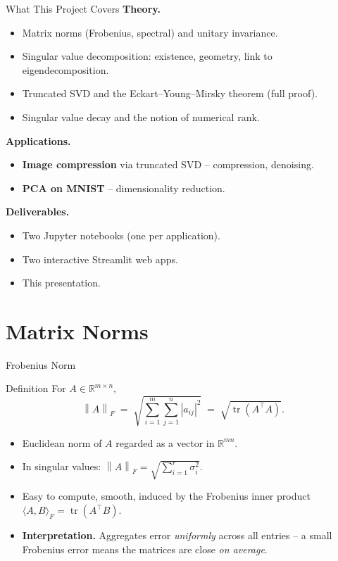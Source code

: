 \documentclass[10pt,aspectratio=169]{beamer}
\DeclareMathOperator{\tr}{tr}
\newcommand{\R}{\mathbb{R}}
\newcommand{\norm}[1]{\left\|#1\right\|}
\begin{document}
\begin{frame}{What This Project Covers}
  \textbf{Theory.}
  \begin{itemize}
    \item Matrix norms (Frobenius, spectral) and unitary invariance.
    \item Singular value decomposition: existence, geometry, link to eigendecomposition.
    \item Truncated SVD and the Eckart--Young--Mirsky theorem (full proof).
    \item Singular value decay and the notion of numerical rank.
  \end{itemize}
  \textbf{Applications.}
  \begin{itemize}
    \item \textbf{Image compression} via truncated SVD -- compression, denoising.
    \item \textbf{PCA on MNIST} -- dimensionality reduction.
  \end{itemize}
  \textbf{Deliverables.}
  \begin{itemize}
    \item Two Jupyter notebooks (one per application).
    \item Two interactive Streamlit web apps.
    \item This presentation.
  \end{itemize}
\end{frame}

\section{Matrix Norms}

\begin{frame}{Frobenius Norm}
  \begin{block}{Definition}
    For $A \in \R^{m \times n}$,
    \[
      \norm{A}_F \;=\; \sqrt{\sum_{i=1}^m \sum_{j=1}^n |a_{ij}|^2}
                 \;=\; \sqrt{\tr(A^\top A)}.
    \]
  \end{block}
  \begin{itemize}
    \item Euclidean norm of $A$ regarded as a vector in $\R^{mn}$.
    \item In singular values: $\norm{A}_F = \sqrt{\sum_{i=1}^{r} \sigma_i^2}$.
    \item Easy to compute, smooth, induced by the Frobenius inner product
      $\langle A, B\rangle_F = \tr(A^\top B)$.
    \item \textbf{Interpretation.} Aggregates error \emph{uniformly} across all entries -- a small Frobenius error means the matrices are close \emph{on average}.
  \end{itemize}
\end{frame}
\end{document}
